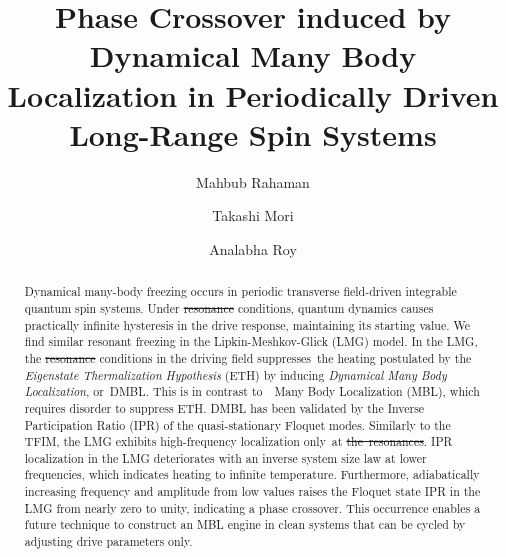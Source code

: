 \documentclass[%
reprint,
superscriptaddress,
amsmath,amssymb,
aps,
prb,
showkeys,
]{revtex4-2}
\providecommand{\DIFaddtex}[1]{{\protect\color{blue}\uwave{#1}}} %
\providecommand{\DIFdeltex}[1]{{\protect\color{red}\sout{#1}}}                      %
\providecommand{\DIFaddbegin}{} %
\providecommand{\DIFaddend}{} %
\providecommand{\DIFdelbegin}{} %
\providecommand{\DIFdelend}{} %
\providecommand{\DIFadd}[1]{\texorpdfstring{\DIFaddtex{#1}}{#1}} %
\providecommand{\DIFdel}[1]{\texorpdfstring{\DIFdeltex{#1}}{}} %
\newcommand{\DIFscaledelfig}{0.5}
\newlength{\DIFdelgraphicswidth} %
\newlength{\DIFdelgraphicsheight} %
\newcommand{\DIFaddincludegraphics}[2][]{{\color{blue}\fbox{\DIFOincludegraphics[#1]{#2}}}} %
\newcommand{\DIFdelincludegraphics}[2][]{%
\sbox{\DIFdelgraphicsbox}{\DIFOincludegraphics[#1]{#2}}%
\settoboxwidth{\DIFdelgraphicswidth}{\DIFdelgraphicsbox} %
\settoboxtotalheight{\DIFdelgraphicsheight}{\DIFdelgraphicsbox} %
\scalebox{\DIFscaledelfig}{%
\parbox[b]{\DIFdelgraphicswidth}{\usebox{\DIFdelgraphicsbox}\\[-\baselineskip] \rule{\DIFdelgraphicswidth}{0em}}\llap{\resizebox{\DIFdelgraphicswidth}{\DIFdelgraphicsheight}{%
\setlength{\unitlength}{\DIFdelgraphicswidth}%
\begin{picture}(1,1)%
\thicklines\linethickness{2pt} %
{\color[rgb]{1,0,0}\put(0,0){\framebox(1,1){}}}%
{\color[rgb]{1,0,0}\put(0,0){\line( 1,1){1}}}%
{\color[rgb]{1,0,0}\put(0,1){\line(1,-1){1}}}%
\end{picture}%
}\hspace*{3pt}}} %
} %
\DeclareRobustCommand{\DIFaddbegin}{\DIFOaddbegin \let\includegraphics\DIFaddincludegraphics} %
\DeclareRobustCommand{\DIFaddend}{\DIFOaddend \let\includegraphics\DIFOincludegraphics} %
\DeclareRobustCommand{\DIFdelbegin}{\DIFOdelbegin \let\includegraphics\DIFdelincludegraphics} %
\DeclareRobustCommand{\DIFdelend}{\DIFOaddend \let\includegraphics\DIFOincludegraphics} %
\begin{document}

\title{Phase Crossover induced by Dynamical Many Body Localization in Periodically Driven Long-Range Spin Systems}

\author{Mahbub Rahaman}
\author{Takashi Mori}
\author{Analabha Roy}


\begin{abstract}
	Dynamical many-body freezing occurs in periodic transverse field-driven integrable quantum spin systems. Under \DIFdelbegin \DIFdel{resonance }\DIFdelend \DIFaddbegin \DIFadd{freezing }\DIFaddend conditions, quantum dynamics causes practically infinite hysteresis in the drive response, maintaining its starting value. We find similar resonant freezing in the Lipkin-Meshkov-Glick (LMG) model. In the LMG, the \DIFdelbegin \DIFdel{resonance }\DIFdelend \DIFaddbegin \DIFadd{freezing }\DIFaddend conditions in the driving field suppresses the heating postulated by the \textit{Eigenstate Thermalization Hypothesis} (ETH)		
	by inducing \textit{Dynamical Many Body Localization}, or DMBL. This is in contrast to  Many Body Localization (MBL), which requires disorder to suppress ETH. DMBL has been validated by the Inverse Participation Ratio (IPR) of the quasi-stationary Floquet modes. Similarly to the TFIM, the LMG exhibits high-frequency localization only at \DIFdelbegin \DIFdel{the resonances}\DIFdelend \DIFaddbegin \DIFadd{freezing points}\DIFaddend . IPR localization in the LMG deteriorates with an inverse system size law at lower frequencies, which indicates heating to infinite temperature. Furthermore, adiabatically increasing frequency and amplitude from low values raises the Floquet state IPR in the LMG from nearly zero to unity, indicating a phase crossover. This occurrence enables a future technique to construct an MBL engine in clean systems that can be cycled by adjusting drive parameters only.
\end{abstract}

\maketitle
\DIFdelbegin %
\end{document}
